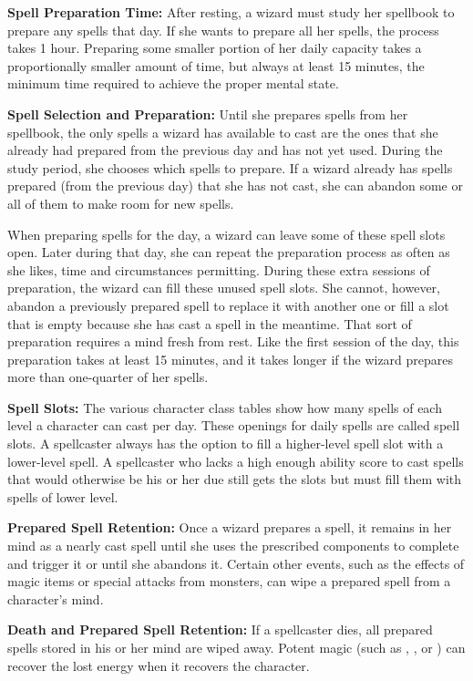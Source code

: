 \textbf{Spell Preparation Time:} After resting, a wizard must study her spellbook 
to prepare any spells that day. If she wants to prepare all her spells, the process 
takes 1 hour. Preparing some smaller portion of her daily capacity takes a proportionally 
smaller amount of time, but always at least 15 minutes, the minimum time required 
to achieve the proper mental state.

\textbf{Spell Selection and Preparation:} Until she prepares spells from her spellbook, 
the only spells a wizard has available to cast are the ones that she already had 
prepared from the previous day and has not yet used. During the study period, she 
chooses which spells to prepare. If a wizard already has spells prepared (from 
the previous day) that she has not cast, she can abandon some or all of them to 
make room for new spells.

When preparing spells for the day, a wizard can leave some of these spell slots 
open. Later during that day, she can repeat the preparation process as often as 
she likes, time and circumstances permitting. During these extra sessions of preparation, 
the wizard can fill these unused spell slots. She cannot, however, abandon a previously 
prepared spell to replace it with another one or fill a slot that is empty because 
she has cast a spell in the meantime. That sort of preparation requires a mind 
fresh from rest. Like the first session of the day, this preparation takes at least 
15 minutes, and it takes longer if the wizard prepares more than one-quarter of 
her spells.

\textbf{Spell Slots:} The various character class tables show how many spells of 
each level a character can cast per day. These openings for daily spells are called 
spell slots. A spellcaster always has the option to fill a higher-level spell slot 
with a lower-level spell. A spellcaster who lacks a high enough ability score to 
cast spells that would otherwise be his or her due still gets the slots but must 
fill them with spells of lower level.

\textbf{Prepared Spell Retention:} Once a wizard prepares a spell, it remains in 
her mind as a nearly cast spell until she uses the prescribed components to complete 
and trigger it or until she abandons it. Certain other events, such as the effects 
of magic items or special attacks from monsters, can wipe a prepared spell from 
a character's mind.

\textbf{Death and Prepared Spell Retention:} If a spellcaster dies, all prepared 
spells stored in his or her mind are wiped away. Potent magic (such as ,
, or ) can recover the lost energy 
when it recovers the character.

